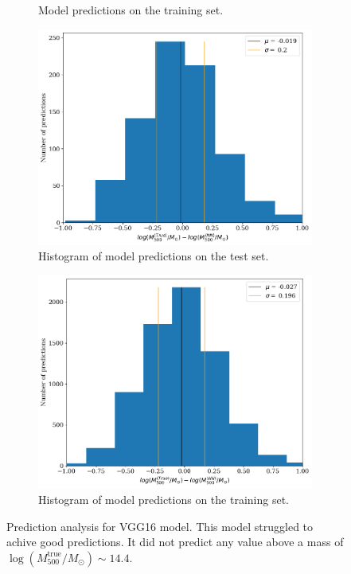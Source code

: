 \begin{figure}[H]
\begin{subfigure}{.46\textwidth}
  \caption{Model predictions on the training set.}
  \label{fig:best_perf_vgg16_b}
\end{subfigure}
\begin{subfigure}{.46\textwidth}
  \centering
  \includegraphics[width=\linewidth]{images/Chapter4/VGG16/vgg_pred_test_hist.png}
  \caption{Histogram of model predictions on the test set.}
  \label{fig:best_perf_vgg16_c}
\end{subfigure}%
\hspace{.6em}
\begin{subfigure}{.46\textwidth}
  \centering
  \includegraphics[width=\linewidth]{images/Chapter4/VGG16/vgg_pred_train_hist.png}
  \caption{Histogram of model predictions on the training set.}
  \label{fig:best_perf_vgg16_d}
\end{subfigure}
\caption{Prediction analysis for VGG16 model. This model struggled to achive good predictions. It did not predict any value above a mass of $\log{(M_{500}^{\text{true}}/M_{\odot})} \sim 14.4$. } 
\label{fig:best_perf_vgg16}
\end{figure}

